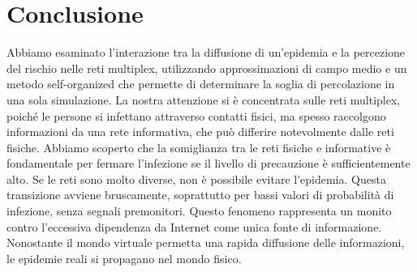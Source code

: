 \section{Conclusione}\label{sec:conclusione}
    Abbiamo esaminato l'interazione tra la diffusione di un'epidemia e la percezione del rischio nelle reti multiplex,
    utilizzando approssimazioni di campo medio e un metodo self-organized che permette di determinare la soglia
    di percolazione in una sola simulazione.
    La nostra attenzione si è concentrata sulle reti multiplex, poiché le persone si infettano attraverso contatti
    fisici, ma spesso raccolgono informazioni da una rete informativa, che può differire notevolmente dalle reti fisiche.
    Abbiamo scoperto che la somiglianza tra le reti fisiche e informative è fondamentale per fermare l'infezione se il
    livello di precauzione è sufficientemente alto.
    Se le reti sono molto diverse, non è possibile evitare l'epidemia.
    Questa transizione avviene bruscamente, soprattutto per bassi valori di probabilità di infezione, senza segnali
    premonitori.
    Questo fenomeno rappresenta un monito contro l'eccessiva dipendenza da Internet come unica fonte di informazione.
    Nonostante il mondo virtuale permetta una rapida diffusione delle informazioni, le epidemie reali si propagano
    nel mondo fisico.